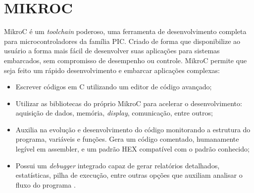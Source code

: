 \section{MIKROC}
MikroC é um \emph{toolchain} poderoso, uma ferramenta de desenvolvimento completa para microcontroladores da família PIC. Criado de forma que disponibilize ao usuário a forma mais fácil de desenvolver suas aplicações para sistemas embarcados, sem compromisso de desempenho ou controle. MikroC permite que seja feito um rápido desenvolvimento e embarcar aplicações complexas:

\begin{itemize}
\item Escrever códigos em C utilizando um editor de código avançado;
\item Utilizar as bibliotecas do próprio MikroC para acelerar o desenvolvimento: aquisição de dados, memória, \emph{display}, comunicação, entre outros;
\item Auxilia na evolução e desenvolvimento do código monitorando a estrutura do programa, variáveis e funções. Gera um código comentado, humanamente legível em assembler, e um padrão HEX compatível com o padrão conhecido;
\item Possui um \emph{debugger} integrado capaz de gerar relatórios detalhados, estatísticas, pilha de execução, entre outras opções que auxiliam analisar o fluxo do programa \cite{mikroc2006}.
\end{itemize}